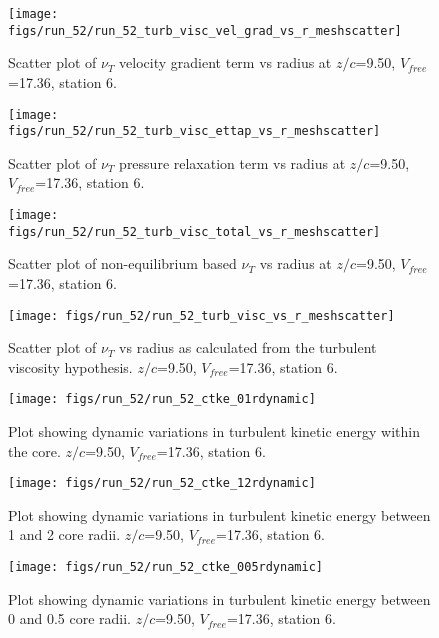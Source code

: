 \begin{figure}[H]
\centering
\texttt{[image: figs/run\_52/run\_52\_turb\_visc\_vel\_grad\_vs\_r\_meshscatter]}
\caption{Scatter plot of $\nu_T$ velocity gradient term vs radius at $z/c$=9.50, $V_{free}$=17.36, station 6.}
\end{figure}


\begin{figure}[H]
\centering
\texttt{[image: figs/run\_52/run\_52\_turb\_visc\_ettap\_vs\_r\_meshscatter]}
\caption{Scatter plot of $\nu_T$ pressure relaxation term vs radius at $z/c$=9.50, $V_{free}$=17.36, station 6.}
\end{figure}


\begin{figure}[H]
\centering
\texttt{[image: figs/run\_52/run\_52\_turb\_visc\_total\_vs\_r\_meshscatter]}
\caption{Scatter plot of non-equilibrium based $\nu_T$ vs radius at $z/c$=9.50, $V_{free}$=17.36, station 6.}
\end{figure}


\begin{figure}[H]
\centering
\texttt{[image: figs/run\_52/run\_52\_turb\_visc\_vs\_r\_meshscatter]}
\caption{Scatter plot of $\nu_T$ vs radius as calculated from the turbulent viscosity hypothesis. $z/c$=9.50, $V_{free}$=17.36, station 6.}
\end{figure}


\begin{figure}[H]
\centering
\texttt{[image: figs/run\_52/run\_52\_ctke\_01rdynamic]}
\caption{Plot showing dynamic variations in turbulent kinetic energy within the core. $z/c$=9.50, $V_{free}$=17.36, station 6.}
\end{figure}


\begin{figure}[H]
\centering
\texttt{[image: figs/run\_52/run\_52\_ctke\_12rdynamic]}
\caption{Plot showing dynamic variations in turbulent kinetic energy between 1 and 2 core radii. $z/c$=9.50, $V_{free}$=17.36, station 6.}
\end{figure}


\begin{figure}[H]
\centering
\texttt{[image: figs/run\_52/run\_52\_ctke\_005rdynamic]}
\caption{Plot showing dynamic variations in turbulent kinetic energy between 0 and 0.5 core radii. $z/c$=9.50, $V_{free}$=17.36, station 6.}
\end{figure}


